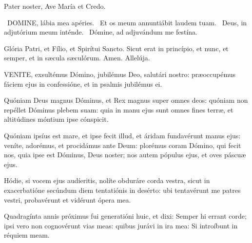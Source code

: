 

Pater noster, Ave María et Credo.


\V\ \lettrine[lines=2]{D}{OMINE}, lábia mea apéries. \R\ Et os meum annuntiábit laudem tuam. \V\ Deus, in adjutórium meum inténde. \R\ Dómine, ad adjuvándum me festína.

Glória Patri, et Fílio, et Spirítui Sancto. Sicut erat in princípio, et nunc, et semper, et in sæcula sæculórum. Amen. Allelúja.



\lettrine[lines=2]{V}{ENITE}, exsultémus Dómino, jubilémus Deo, salutári nostro: præoccupémus fáciem ejus in confessióne, et in psalmis jubilémus ei.


Quóniam Deus magnus Dóminus, et Rex magnus super omnes deos: quóniam non repéllet Dóminus plebem suam: quia in manu ejus sunt omnes fines terræ, et altitúdines móntium ipse cónspicit.



Quóniam ipsíus est mare, et ipse fecit illud, et áridam fundavérunt manus ejus: veníte, adorémus, et procidámus ante Deum: plorémus coram Dómino, qui fecit nos, quia ipse est Dóminus, Deus noster; nos autem pópulus ejus, et oves páscuæ ejus.


Hódie, si vocem ejus audíeritis, nolíte obduráre corda vestra, sicut in exacerbatióne secúndum diem tentatiónis in desérto: ubi tentavérunt me patres vestri, probavérunt et vidérunt ópera mea.


Quadragínta annis próximus fui generatióni huic, et dixi: Semper hi errant corde; ipsi vero non cognovérunt vias meas: quibus jurávi in ira mea: Si introíbunt in réquiem meam.

